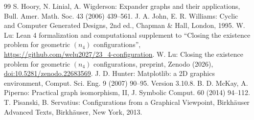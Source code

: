 \documentclass[11pt]{article}
\theoremstyle{plain}
\theoremstyle{definition}
\begin{document}
\begin{thebibliography}{99}
 S. Hoory, N. Linial, A. Wigderson: Expander graphs and their applications, Bull. Amer. Math. Soc. 43 (2006) 439--561.
 J. A. John, E. R. Williams: Cyclic and Computer Generated Designs, 2nd ed., Chapman \& Hall, London, 1995.
 W. Lu: Lean 4 formalization and computational supplement to ``Closing the existence problem for geometric $(n_4)$ configurations'', \url{https://github.com/welu2027/23_4-configuration}.
 W. Lu: Closing the existence problem for geometric $(n_4)$ configurations, preprint, Zenodo (2026), \href{https://doi.org/10.5281/zenodo.22683569}{doi:10.5281/zenodo.22683569}.
 J. D. Hunter: Matplotlib: a 2D graphics environment, Comput. Sci. Eng. 9 (2007) 90--95. Version 3.10.8.
 B. D. McKay, A. Piperno: Practical graph isomorphism, II, J. Symbolic Comput. 60 (2014) 94--112.
 T. Pisanski, B. Servatius: Configurations from a Graphical Viewpoint, Birkh\"auser Advanced Texts, Birkh\"auser, New York, 2013.
\end{thebibliography}
\end{document}
